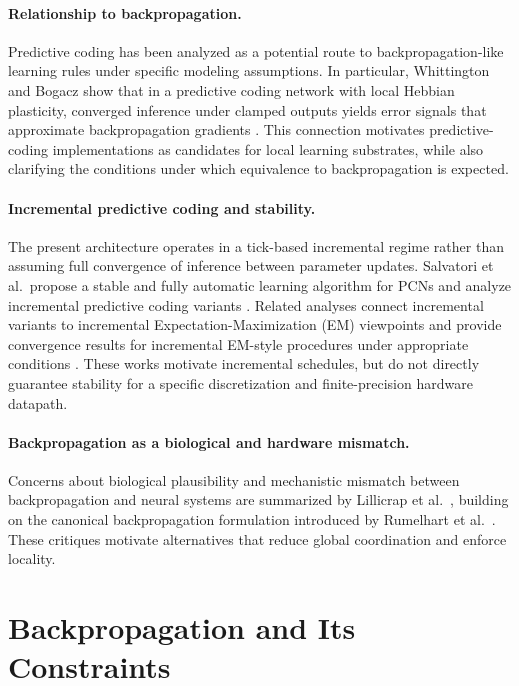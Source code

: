 \documentclass{article}
\begin{document}
\paragraph{Relationship to backpropagation.}
Predictive coding has been analyzed as a potential route to backpropagation-like learning rules under specific modeling assumptions. In particular, Whittington and Bogacz show that in a predictive coding network with local Hebbian plasticity, converged inference under clamped outputs yields error signals that approximate backpropagation gradients \cite{Whittington2017}. This connection motivates predictive-coding implementations as candidates for local learning substrates, while also clarifying the conditions under which equivalence to backpropagation is expected.

\paragraph{Incremental predictive coding and stability.}
The present architecture operates in a tick-based incremental regime rather than assuming full convergence of inference between parameter updates. Salvatori et al.\ propose a stable and fully automatic learning algorithm for PCNs and analyze incremental predictive coding variants \cite{salvatori2023stable}. Related analyses connect incremental variants to incremental Expectation-Maximization (EM) viewpoints \cite{neal1998view} and provide convergence results for incremental EM-style procedures under appropriate conditions \cite{karimi2019global}. These works motivate incremental schedules, but do not directly guarantee stability for a specific discretization and finite-precision hardware datapath.

\paragraph{Backpropagation as a biological and hardware mismatch.}
Concerns about biological plausibility and mechanistic mismatch between backpropagation and neural systems are summarized by Lillicrap et al.\ \cite{lillicrap2020backpropagation}, building on the canonical backpropagation formulation introduced by Rumelhart et al.\ \cite{rumelhart1986learning}. These critiques motivate alternatives that reduce global coordination and enforce locality.

\section{Backpropagation and Its Constraints}
\label{sec:backprop}
\end{document}
